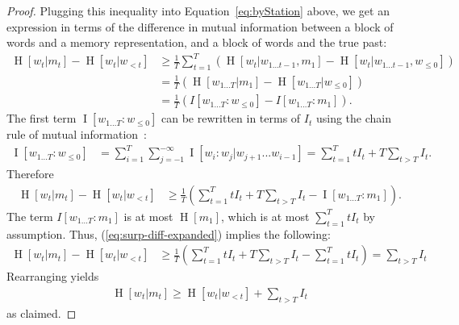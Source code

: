 \documentclass[11pt,letterpaper]{article}
\begin{document}
\begin{proof}
Plugging this inequality into Equation~\ref{eq:byStation} above, we get an expression in terms of the difference in mutual information between a block of words and a memory representation, and a block of words and the true past:
\begin{align}\label{eq:plugged}
\operatorname{H}[w_t | m_t] - \operatorname{H}[w_t | w_{<t}]& \geq \frac{1}{T} \sum_{t=1}^T ( \operatorname{H}[w_t|w_{1\dots t-1}, m_1] - \operatorname{H}[w_t | w_{1\dots t-1}, w_{\leq 0}]  )    \\
& = \frac{1}{T} \left(\operatorname{H}[w_{1\dots T} | m_1] - \operatorname{H}[w_{1\dots T} | w_{\leq 0}]\right)  \\
& = \frac{1}{T} \left(I[w_{1\dots T}: w_{\leq 0}] - I[w_{1\dots T}: m_1]\right).
\end{align}
	The first term $\operatorname{I}[w_{1\dots T}: w_{\leq 0}]$ can be rewritten in terms of $I_t$ using the chain rule of mutual information~\citep{cover2006elements}:
\begin{align}\label{eq:i-expanded}
	\operatorname{I}[w_{1\dots T}: w_{\leq 0}] &= \sum_{i=1}^T \sum_{j=-1}^{-\infty} \operatorname{I}[w_i: w_j | w_{j+1}...w_{i-1}] = \sum_{t=1}^T t I_t + T \sum_{t > T} I_t.
\end{align}
Therefore
\begin{align}\label{eq:surp-diff-expanded}
\operatorname{H}[w_t | m_t] - \operatorname{H}[w_t | w_{<t}]& \geq \frac{1}{T} \left(\sum_{t=1}^T t I_t + T \sum_{t > T} I_t - \operatorname{I}[w_{1\dots T}: m_1]\right).
\end{align}
The term $I[w_{1\dots T}:m_1]$ is at most $\operatorname{H}[m_1]$, which is at most $\sum_{t=1}^T t I_t$ by assumption. Thus,  (\ref{eq:surp-diff-expanded}) implies the following:
\begin{align}\label{eq:bounding-by-mem}
\operatorname{H}[w_t | m_t] - \operatorname{H}[w_t | w_{<t}]& \geq \frac{1}{T} \left(\sum_{t=1}^T t I_t + T \sum_{t > T} I_t - \sum_{t=1}^T t I_t\right) = \sum_{t > T} I_t
\end{align}
Rearranging yields
\begin{align}
\operatorname{H}[w_t|m_t] \geq \operatorname{H}[w_t | w_{<t}] + \sum_{t > T} I_t
\end{align}
as claimed.
\end{proof}

\end{document}
